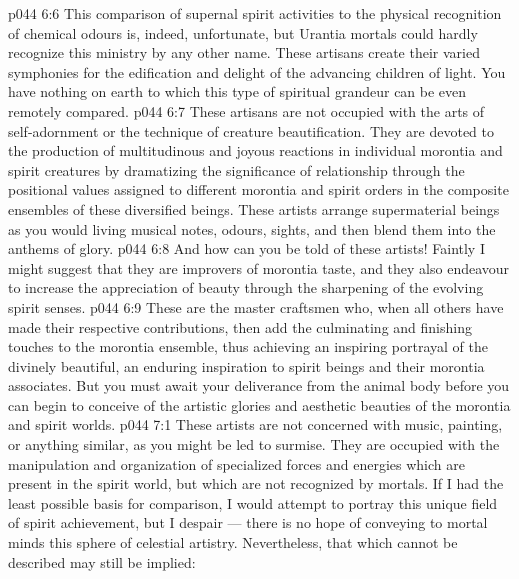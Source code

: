 \vs p044 6:6 \bibnobreakspace {} This comparison of supernal spirit activities to the physical recognition of chemical odours is, indeed, unfortunate, but Urantia mortals could hardly recognize this ministry by any other name. These artisans create their varied symphonies for the edification and delight of the advancing children of light. You have nothing on earth to which this type of spiritual grandeur can be even remotely compared.
\vs p044 6:7 \bibnobreakspace {} These artisans are not occupied with the arts of self\hyp{}adornment or the technique of creature beautification. They are devoted to the production of multitudinous and joyous reactions in individual morontia and spirit creatures by dramatizing the significance of relationship through the positional values assigned to different morontia and spirit orders in the composite ensembles of these diversified beings. These artists arrange supermaterial beings as you would living musical notes, odours, sights, and then blend them into the anthems of glory.
\vs p044 6:8 \bibnobreakspace {} And how can you be told of these artists! Faintly I might suggest that they are improvers of morontia taste, and they also endeavour to increase the appreciation of beauty through the sharpening of the evolving spirit senses.
\vs p044 6:9 \bibnobreakspace {} These are the master craftsmen who, when all others have made their respective contributions, then add the culminating and finishing touches to the morontia ensemble, thus achieving an inspiring portrayal of the divinely beautiful, an enduring inspiration to spirit beings and their morontia associates. But you must await your deliverance from the animal body before you can begin to conceive of the artistic glories and aesthetic beauties of the morontia and spirit worlds.
\vs p044 7:1 These artists are not concerned with music, painting, or anything similar, as you might be led to surmise. They are occupied with the manipulation and organization of specialized forces and energies which are present in the spirit world, but which are not recognized by mortals. If I had the least possible basis for comparison, I would attempt to portray this unique field of spirit achievement, but I despair --- there is no hope of conveying to mortal minds this sphere of celestial artistry. Nevertheless, that which cannot be described may still be implied:
